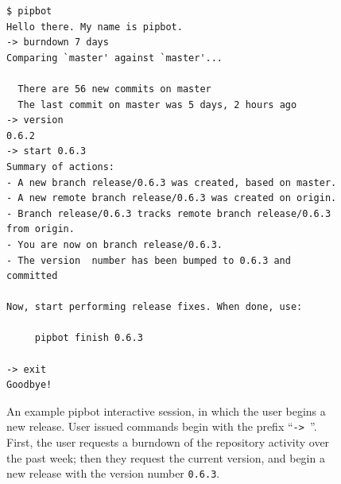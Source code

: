 \begin{figure}[H]
\begin{verbatim}
$ pipbot
Hello there. My name is pipbot.
-> burndown 7 days
Comparing `master' against `master'...

  There are 56 new commits on master
  The last commit on master was 5 days, 2 hours ago
-> version
0.6.2
-> start 0.6.3
Summary of actions:
- A new branch release/0.6.3 was created, based on master.
- A new remote branch release/0.6.3 was created on origin.
- Branch release/0.6.3 tracks remote branch release/0.6.3 from origin.
- You are now on branch release/0.6.3.
- The version  number has been bumped to 0.6.3 and committed

Now, start performing release fixes. When done, use:

     pipbot finish 0.6.3

-> exit
Goodbye!
\end{verbatim}
\caption[Example pipbot session]
  {An example pipbot interactive session, in which the user begins a
   new release. User issued commands begin with the prefix
   ``\texttt{-> }''. First, the user requests a burndown of the
   repository activity over the past week; then they request the
   current version, and begin a new release with the version number
   \texttt{0.6.3}.}
\label{fig:pipbot-session}
\end{figure}
